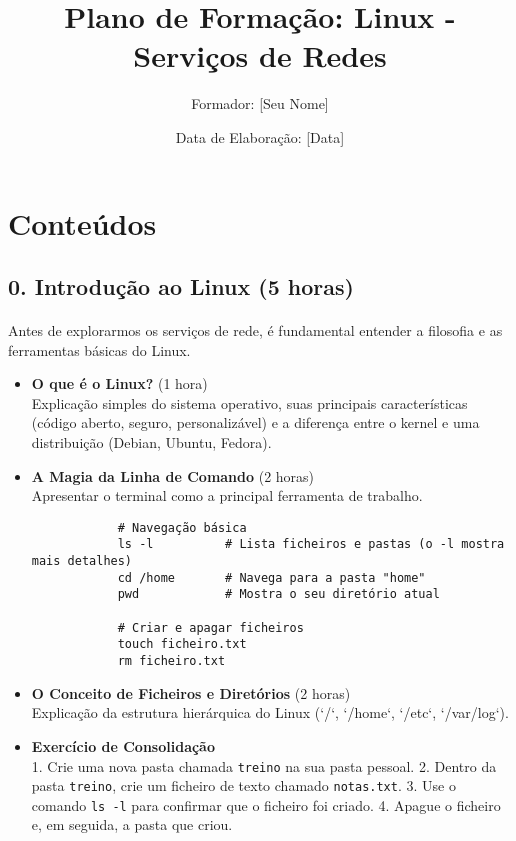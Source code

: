 \documentclass[10pt,a4paper]{article}
\title{Plano de Formação: Linux - Serviços de Redes}
\author{Formador: [Seu Nome]}
\date{Data de Elaboração: [Data]}
\begin{document}
	
	\section*{Conteúdos}
	
	\subsection*{0. Introdução ao Linux (5 horas)}
	\vspace{-1.2em}
	\paragraph{}
	Antes de explorarmos os serviços de rede, é fundamental entender a filosofia e as ferramentas básicas do Linux.
	
	\begin{itemize}
		\item \textbf{O que é o Linux?} (1 hora) \\
		Explicação simples do sistema operativo, suas principais características (código aberto, seguro, personalizável) e a diferença entre o kernel e uma distribuição (Debian, Ubuntu, Fedora).
		
		\item \textbf{A Magia da Linha de Comando} (2 horas) \\
		Apresentar o terminal como a principal ferramenta de trabalho.
		\begin{verbatim}
			# Navegação básica
			ls -l          # Lista ficheiros e pastas (o -l mostra mais detalhes)
			cd /home       # Navega para a pasta "home"
			pwd            # Mostra o seu diretório atual
			
			# Criar e apagar ficheiros
			touch ficheiro.txt
			rm ficheiro.txt
		\end{verbatim}
		
		\item \textbf{O Conceito de Ficheiros e Diretórios} (2 horas) \\
		Explicação da estrutura hierárquica do Linux (`/`, `/home`, `/etc`, `/var/log`).
		
		\item \textbf{Exercício de Consolidação} \\
		1. Crie uma nova pasta chamada \texttt{treino} na sua pasta pessoal.
		2. Dentro da pasta \texttt{treino}, crie um ficheiro de texto chamado \texttt{notas.txt}.
		3. Use o comando \texttt{ls -l} para confirmar que o ficheiro foi criado.
		4. Apague o ficheiro e, em seguida, a pasta que criou.
	\end{itemize}
	
\end{document}
